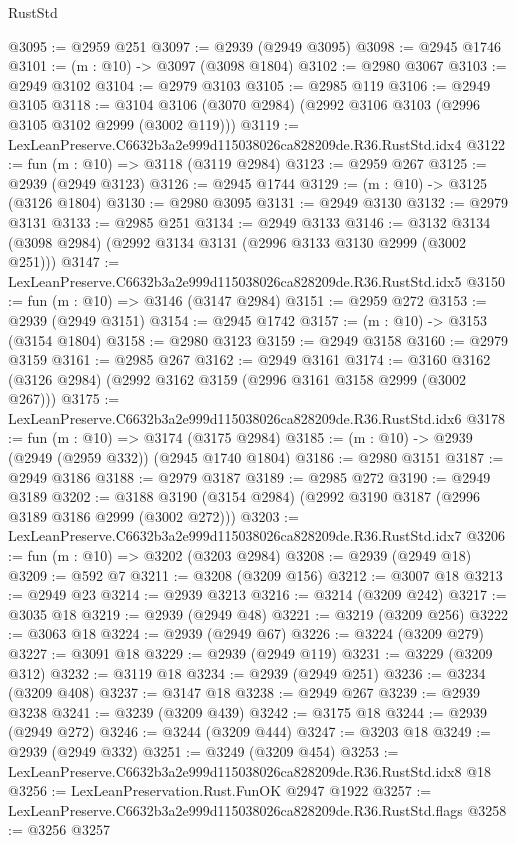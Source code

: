 \begin{lexlean}{RustStd}
\begin{coremodule}
@3095 := @2959 @251
@3097 := @2939 (@2949 @3095)
@3098 := @2945 @1746
@3101 := (m : @10) -> @3097 (@3098 @1804)
@3102 := @2980 @3067
@3103 := @2949 @3102
@3104 := @2979 @3103
@3105 := @2985 @119
@3106 := @2949 @3105
@3118 := @3104 @3106 (@3070 @2984) (@2992 @3106 @3103 (@2996 @3105 @3102 @2999 (@3002 @119)))
@3119 := LexLeanPreserve.C6632b3a2e999d115038026ca828209de.R36.RustStd.idx4
@3122 := fun (m : @10) => @3118 (@3119 @2984)
@3123 := @2959 @267
@3125 := @2939 (@2949 @3123)
@3126 := @2945 @1744
@3129 := (m : @10) -> @3125 (@3126 @1804)
@3130 := @2980 @3095
@3131 := @2949 @3130
@3132 := @2979 @3131
@3133 := @2985 @251
@3134 := @2949 @3133
@3146 := @3132 @3134 (@3098 @2984) (@2992 @3134 @3131 (@2996 @3133 @3130 @2999 (@3002 @251)))
@3147 := LexLeanPreserve.C6632b3a2e999d115038026ca828209de.R36.RustStd.idx5
@3150 := fun (m : @10) => @3146 (@3147 @2984)
@3151 := @2959 @272
@3153 := @2939 (@2949 @3151)
@3154 := @2945 @1742
@3157 := (m : @10) -> @3153 (@3154 @1804)
@3158 := @2980 @3123
@3159 := @2949 @3158
@3160 := @2979 @3159
@3161 := @2985 @267
@3162 := @2949 @3161
@3174 := @3160 @3162 (@3126 @2984) (@2992 @3162 @3159 (@2996 @3161 @3158 @2999 (@3002 @267)))
@3175 := LexLeanPreserve.C6632b3a2e999d115038026ca828209de.R36.RustStd.idx6
@3178 := fun (m : @10) => @3174 (@3175 @2984)
@3185 := (m : @10) -> @2939 (@2949 (@2959 @332)) (@2945 @1740 @1804)
@3186 := @2980 @3151
@3187 := @2949 @3186
@3188 := @2979 @3187
@3189 := @2985 @272
@3190 := @2949 @3189
@3202 := @3188 @3190 (@3154 @2984) (@2992 @3190 @3187 (@2996 @3189 @3186 @2999 (@3002 @272)))
@3203 := LexLeanPreserve.C6632b3a2e999d115038026ca828209de.R36.RustStd.idx7
@3206 := fun (m : @10) => @3202 (@3203 @2984)
@3208 := @2939 (@2949 @18)
@3209 := @592 @7
@3211 := @3208 (@3209 @156)
@3212 := @3007 @18
@3213 := @2949 @23
@3214 := @2939 @3213
@3216 := @3214 (@3209 @242)
@3217 := @3035 @18
@3219 := @2939 (@2949 @48)
@3221 := @3219 (@3209 @256)
@3222 := @3063 @18
@3224 := @2939 (@2949 @67)
@3226 := @3224 (@3209 @279)
@3227 := @3091 @18
@3229 := @2939 (@2949 @119)
@3231 := @3229 (@3209 @312)
@3232 := @3119 @18
@3234 := @2939 (@2949 @251)
@3236 := @3234 (@3209 @408)
@3237 := @3147 @18
@3238 := @2949 @267
@3239 := @2939 @3238
@3241 := @3239 (@3209 @439)
@3242 := @3175 @18
@3244 := @2939 (@2949 @272)
@3246 := @3244 (@3209 @444)
@3247 := @3203 @18
@3249 := @2939 (@2949 @332)
@3251 := @3249 (@3209 @454)
@3253 := LexLeanPreserve.C6632b3a2e999d115038026ca828209de.R36.RustStd.idx8 @18
@3256 := LexLeanPreservation.Rust.FunOK @2947 @1922
@3257 := LexLeanPreserve.C6632b3a2e999d115038026ca828209de.R36.RustStd.flags
@3258 := @3256 @3257

\end{coremodule}
\end{lexlean}
